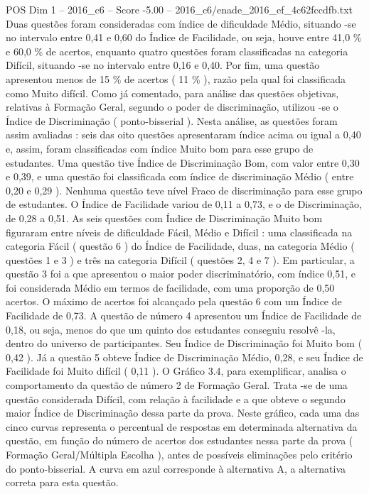 \begin{textsample}{POS Dim 1 – 2016\_c6 – Score -5.00 – 2016\_c6/enade\_2016\_ef\_4c62fccdfb.txt}
Duas questões foram consideradas com índice de dificuldade Médio, situando -se no intervalo entre 0,41 e 0,60 do Índice de Facilidade, ou seja, houve entre 41,0 \% e 60,0 \% de acertos, enquanto quatro questões foram classificadas na categoria Difícil, situando -se no intervalo entre 0,16 e 0,40.
Por fim, uma questão apresentou menos de 15 \% de acertos ( 11 \% ), razão pela qual foi classificada como Muito difícil.
Como já comentado, para análise das questões objetivas, relativas à Formação Geral, segundo o poder de discriminação, utilizou -se o Índice de Discriminação ( ponto-bisserial ).
Nesta análise, as questões foram assim avaliadas : seis das oito questões apresentaram índice acima ou igual a 0,40 e, assim, foram classificadas com índice Muito bom para esse grupo de estudantes.
Uma questão tive Índice de Discriminação Bom, com valor entre 0,30 e 0,39, e uma questão foi classificada com índice de discriminação Médio ( entre 0,20 e 0,29 ).
Nenhuma questão teve nível Fraco de discriminação para esse grupo de estudantes.
O Índice de Facilidade variou de 0,11 a 0,73, e o de Discriminação, de 0,28 a 0,51.
As seis questões com Índice de Discriminação Muito bom figuraram entre níveis de dificuldade Fácil, Médio e Difícil : uma classificada na categoria Fácil ( questão 6 ) do Índice de Facilidade, duas, na categoria Médio ( questões 1 e 3 ) e três na categoria Difícil ( questões 2, 4 e 7 ).
Em particular, a questão 3 foi a que apresentou o maior poder discriminatório, com índice 0,51, e foi considerada Médio em termos de facilidade, com uma proporção de 0,50 acertos.
O máximo de acertos foi alcançado pela questão 6 com um Índice de Facilidade de 0,73.
A questão de número 4 apresentou um Índice de Facilidade de 0,18, ou seja, menos do que um quinto dos estudantes conseguiu resolvê -la, dentro do universo de participantes.
Seu Índice de Discriminação foi Muito bom ( 0,42 ).
Já a questão 5 obteve Índice de Discriminação Médio, 0,28, e seu Índice de Facilidade foi Muito difícil ( 0,11 ).
O Gráfico 3.4, para exemplificar, analisa o comportamento da questão de número 2 de Formação Geral.
Trata -se de uma questão considerada Difícil, com relação à facilidade e a que obteve o segundo maior Índice de Discriminação dessa parte da prova.
Neste gráfico, cada uma das cinco curvas representa o percentual de respostas em determinada alternativa da questão, em função do número de acertos dos estudantes nessa parte da prova ( Formação Geral/Múltipla Escolha ), antes de possíveis eliminações pelo critério do ponto-bisserial.
A curva em azul corresponde à alternativa A, a alternativa correta para esta questão.

\end{textsample}
